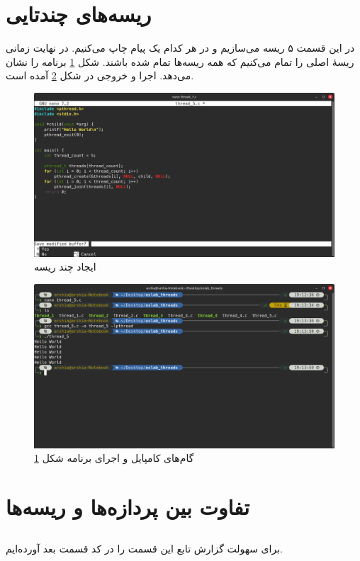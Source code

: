 \documentclass[12pt]{article}
\begin{document}
	\section{ریسه‌های چندتایی}
	در این قسمت ۵ ریسه می‌سازیم و در هر کدام یک پیام چاپ می‌کنیم. در نهایت زمانی ریسهٔ اصلی را تمام می‌کنیم که همه ریسه‌ها تمام شده باشند. شکل \ref{img:9} برنامه را نشان می‌دهد. اجرا و خروجی در شکل \ref{img:10} آمده است.
	\begin{figure}[H]
		\centering
		\includegraphics[width=\textwidth]{report7-resources/9.png}
		\caption{ایجاد چند ریسه}
		\label{img:9}
	\end{figure}
	\begin{figure}[H]
		\centering
		\includegraphics[width=\textwidth]{report7-resources/10.png}
		\caption{گام‌های کامپایل و اجرای برنامه شکل \ref{img:9}}
		\label{img:10}
	\end{figure}
	\newpage
	\section{تفاوت بین پردازه‌ها و ریسه‌ها}
	\subsection{}
	برای سهولت گزارش تابع این قسمت را در کد قسمت بعد آورده‌ایم.
\end{document}

